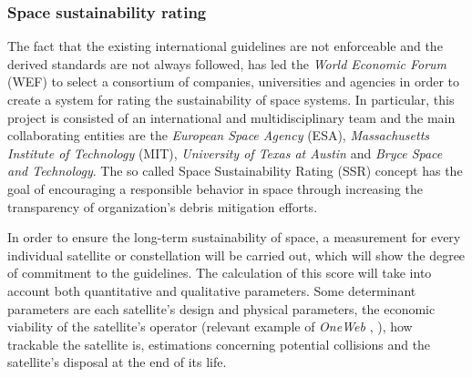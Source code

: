\subsubsection{Space sustainability rating}
\bigskip
The fact that the existing international guidelines are not enforceable and the derived standards are not always followed, has led the \textit{World Economic Forum} (WEF) to select a consortium of companies, universities and agencies in order to create a system for rating the sustainability of space systems. \cite{Space sustainability}  %
In particular, this project is consisted of an international and multidisciplinary team and the main collaborating entities are the \textit{European Space Agency} (ESA), \textit{Massachusetts Institute of Technology} (MIT), \textit{University of Texas at Austin} and \textit{Bryce Space and Technology}. The so called Space Sustainability Rating (SSR) concept has the goal of encouraging a responsible behavior in space through increasing the transparency of organization's debris mitigation efforts.

In order to ensure the long-term sustainability of space, a measurement for every individual satellite or constellation will be carried out, which will show the degree of commitment to the guidelines. 
The calculation of this score will take into account both quantitative and qualitative parameters. Some determinant parameters are each satellite's design and physical parameters, the economic viability of the satellite's operator (relevant example of \textit{OneWeb} \cite{Oneweb_bankruptcy}, \cite{Cadman}), %
how trackable the satellite is, estimations concerning potential collisions and the satellite's disposal at the end of its life. 


